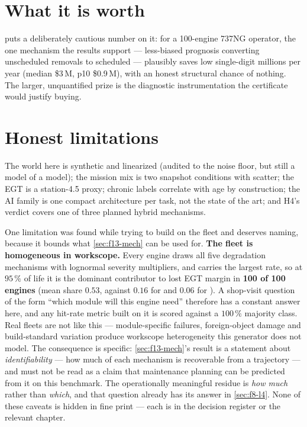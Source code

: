 \section{What it is worth}

 puts a deliberately cautious number on it: for a 100-engine 737NG
operator, the one mechanism the results support --- less-biased prognosis converting
unscheduled removals to scheduled --- plausibly saves low single-digit millions per year
(median \$3\,M, p10 \$0.9\,M), with an honest structural chance of nothing. The larger,
unquantified prize is the diagnostic instrumentation the certificate would justify buying.

\section{Honest limitations}
\label{sec:limitations-conclusions}

The world here is synthetic and linearized (audited to the noise floor, but still a model
of a model); the mission mix is two snapshot conditions with scatter; the EGT is a
station-4.5 proxy; chronic labels correlate with age by construction; the AI family is one
compact architecture per task, not the state of the art; and H4's verdict covers one of
three planned hybrid mechanisms.

One limitation was found while trying to build on the fleet and deserves naming, because it
bounds what \cref{sec:f13-mech} can be used for. \textbf{The fleet is homogeneous in
workscope.} Every engine draws all five degradation mechanisms with lognormal severity
multipliers, and  carries the largest rate, so at $95\,\%$ of life it is the
dominant contributor to lost EGT margin in \textbf{100 of 100 engines} (mean share $0.53$,
against $0.16$ for  and $0.06$ for ). A shop-visit question of
the form ``which module will this engine need'' therefore has a constant answer here, and any
hit-rate metric built on it is scored against a $100\,\%$ majority class. Real fleets are not
like this --- module-specific failures, foreign-object damage and build-standard variation
produce workscope heterogeneity this generator does not model. The consequence is specific:
\cref{sec:f13-mech}'s result is a statement about \emph{identifiability} --- how much of each
mechanism is recoverable from a trajectory --- and must not be read as a claim that maintenance
planning can be predicted from it on this benchmark. The operationally meaningful residue is
\emph{how much} rather than \emph{which}, and that question already has its answer in
\cref{sec:f8-l4}. None of these caveats is hidden in fine print --- each is
in the decision register or the relevant chapter.

